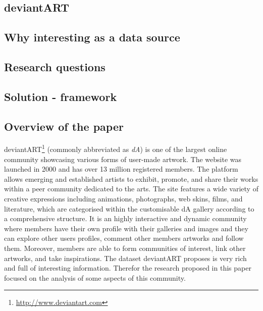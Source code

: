 \subsection{deviantART}
\subsection{Why interesting as a data source}
\subsection{Research questions}
\subsection{Solution - framework}
\subsection{Overview of the paper}

deviantART\footnote{\url{http://www.deviantart.com}} (commonly abbreviated as \textit{dA}) is one of the largest online community showcasing various forms of user-made artwork. The website was launched in 2000 and has over 13 million registered members.
The platform allows emerging and established artists to exhibit, promote, and share their works within a peer community dedicated to the arts. 
The site features a wide variety of creative expressions including animations, photographs, web skins, films, and literature, which are categorised within the customisable dA gallery according to a comprehensive structure. 
It is an highly interactive and dynamic community where members have their own profile with their galleries and images and they can explore other users profiles, comment other members artworks and follow them. Moreover, members are able to form communities of interest, link other artworks, and take inspirations.
The dataset deviantART proposes is very rich and full of interesting information. Therefor the research proposed in this paper focused on the analysis of some aspects of this community. 


